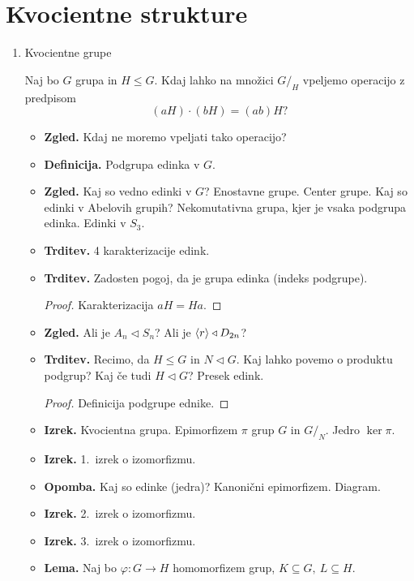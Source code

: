 \section{Kvocientne strukture}

\begin{enumerate}
    \item Kvocientne grupe
    
    Naj bo \(G\) grupa in \(H \leq G\). Kdaj lahko na množici \(G/_H\) vpeljemo operacijo z predpisom 
    \[(aH) \cdot (bH) = (ab)H?\]
    \begin{itemize}
        \item \textbf{Zgled.} Kdaj ne moremo vpeljati tako operacijo?
        \item \textbf{Definicija.} Podgrupa edinka v \(G\).
        \item \textbf{Zgled.} Kaj so vedno edinki v \(G\)? Enostavne grupe. Center grupe. Kaj so edinki v Abelovih grupih? Nekomutativna grupa, kjer je vsaka podgrupa edinka. Edinki v \(S_3\).
        \item \textbf{Trditev.} 4 karakterizacije edink. 
        \item \textbf{Trditev.} Zadosten pogoj, da je grupa edinka (indeks podgrupe).
        \begin{proof}
            Karakterizacija \(aH = Ha\).
        \end{proof}
        \item \textbf{Zgled.} Ali je \(A_n \triangleleft S_n\)? Ali je \(\langle {r} \rangle \triangleleft D_{2n}\)?
        \item \textbf{Trditev.} Recimo, da \(H \leq G\) in \(N \triangleleft G\). Kaj lahko povemo o produktu podgrup? Kaj če tudi \(H \triangleleft G\)? Presek edink.
        \begin{proof}
            Definicija podgrupe ednike.
        \end{proof}
        \item \textbf{Izrek.} Kvocientna grupa. Epimorfizem \(\pi\) grup \(G\) in \(G/_N\). Jedro \(\ker \pi\).
        \item \textbf{Izrek.} 1.\ izrek o izomorfizmu. \todo{*}
        \item \textbf{Opomba.} Kaj so edinke (jedra)? Kanonični epimorfizem. Diagram.
        \item \textbf{Izrek.} 2.\ izrek o izomorfizmu.
        \item \textbf{Izrek.} 3.\ izrek o izomorfizmu.
        \item \textbf{Lema.} Naj bo \(\varphi: G \to H\) homomorfizem grup, \(K \subseteq G, \ L \subseteq H\).

\end{itemize}
\end{enumerate}
